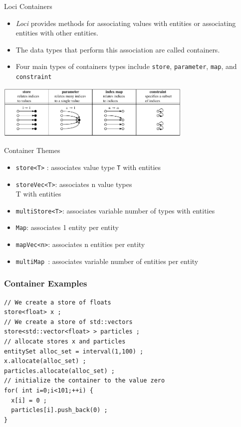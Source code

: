 \documentclass{beamer}
\begin{document}
\begin{frame}{Loci Containers}
\begin{itemize}
\item {\it Loci} provides methods for associating values with entities or associating entities with other entities.
\item The data types that perform this association are called containers.
\item Four main types of containers types include {\tt store}, {\tt parameter}, {\tt map}, and {\tt constraint}
\end{itemize}
\begin{center}
\includegraphics[height=1in]{constructs}
\end{center}
\end{frame}

\begin{frame}{Container Themes}
\begin{itemize}
\item {\tt store<T>} : associates value type {\tt T} with entities
\item {\tt storeVec<T>}: associates n value types {\\ T} with entities
\item {\tt multiStore<T>}: associates variable number of types with entities
\item {\tt Map}: associates 1 entity per entity
\item {\tt mapVec<n>}: associates n entities per entity
\item {\tt multiMap }: associates variable number of entities per entity
\end{itemize}
\end{frame}

\begin{frame}[fragile=singleslide]\frametitle{Container Examples}
\begin{verbatim}
// We create a store of floats
store<float> x ;
// We create a store of std::vectors
store<std::vector<float> > particles ;
// allocate stores x and particles
entitySet alloc_set = interval(1,100) ;
x.allocate(alloc_set) ;
particles.allocate(alloc_set) ;
// initialize the container to the value zero
for( int i=0;i<101;++i) {
  x[i] = 0 ;
  particles[i].push_back(0) ; 
}
\end{verbatim}
\end{frame}
\end{document}
